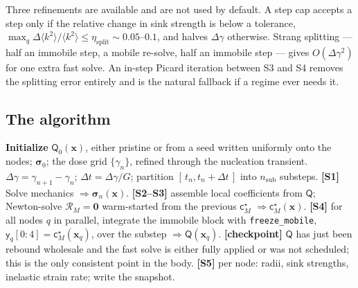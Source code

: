 \documentclass{article}
\newcommand{\spvec}[1]{\bm{\mathsf{#1}}}   %
\newcommand{\code}[1]{\texttt{#1}}
\begin{document}
Three refinements are available and are not used by default. A step cap accepts
a step only if the relative change in sink strength is below a tolerance,
$\max_q\Delta\langle k^2\rangle/\langle k^2\rangle\le\eta_{\mathrm{split}}\sim
0.05$--$0.1$, and halves $\Delta\gamma$ otherwise. Strang splitting --- half an
immobile step, a mobile re-solve, half an immobile step --- gives
$O(\Delta\gamma^2)$ for one extra fast solve. An in-step Picard iteration between
S3 and S4 removes the splitting error entirely and is the natural fallback if a
regime ever needs it.

\subsection{The algorithm}
\label{sec:algorithm}

\begin{algorithm}[htbp]
\caption{Operator-split QSSA march: quasi-steady mobile FEM $\oplus$ pointwise
immobile CVODE.}
\label{alg:march}
\begin{algorithmic}[1]
\State \textbf{Initialize} $\spvec Q_0(\bm x)$, either pristine or from a seed
       written uniformly onto the nodes; $\bm\sigma_0$; the dose grid
       $\{\gamma_n\}$, refined through the nucleation transient.
  \State $\Delta\gamma=\gamma_{n+1}-\gamma_n$; \; $\Delta t=\Delta\gamma/G$;
         partition $[\,t_n,t_n+\Delta t\,]$ into $n_{\mathrm{sub}}$ substeps.
  \State \textbf{[S1]} Solve mechanics $\Rightarrow\bm\sigma_n(\bm x)$.
      \State \textbf{[S2--S3]} assemble local coefficients from $\spvec Q$;
             Newton-solve $\mathcal R_M=\mathbf 0$ warm-started from the previous
             $\spvec c^\star_M$ $\Rightarrow\spvec c^\star_M(\bm x)$.
    \EndIf
    \State \textbf{[S4]} for all nodes $q$ in parallel, integrate the immobile
           block with \code{freeze\_mobile}, $\spvec y_q[0{:}4]=\spvec c^\star_M(\bm x_q)$,
           over the substep $\Rightarrow\spvec Q(\bm x_q)$.
    \State \textbf{[checkpoint]} $\spvec Q$ has just been rebound wholesale and
           the fast solve is either fully applied or was not scheduled; this is
           the only consistent point in the body.
  \EndFor
  \State \textbf{[S5]} per node: radii, sink strengths, inelastic strain rate;
         write the snapshot.
\EndFor
\end{algorithmic}
\end{algorithm}
\end{document}
